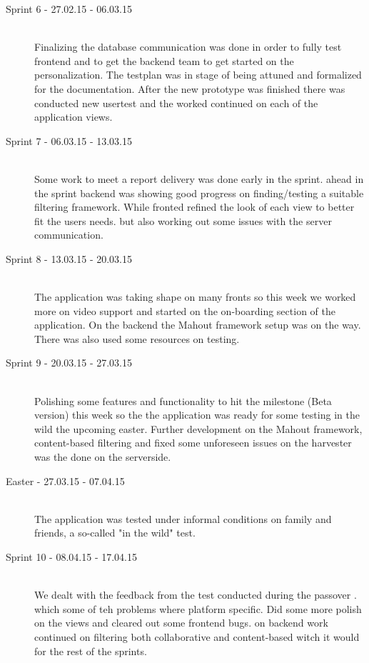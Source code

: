 \begin{description}
	\item[Sprint 6 - 27.02.15 - 06.03.15] \hfill \\ 
	Finalizing the database communication was done in order to fully test frontend and to get the backend team to get started on the personalization. The testplan was in stage of being attuned and formalized for the documentation. After the new prototype was finished there was conducted new usertest and the worked continued on each of the application views.
	
	\item[Sprint 7 - 06.03.15 - 13.03.15] \hfill \\ 
	Some work to meet a report delivery was done early in the sprint. ahead in the sprint backend was showing good progress on finding/testing a suitable filtering framework. While fronted refined the look of each view to better fit the users needs. but also working out some issues with the server communication.
	
	\item[Sprint 8 - 13.03.15 - 20.03.15] \hfill \\ 
	The application was taking shape on many fronts so this week we worked more on video support and started on the on-boarding section of the application. On the backend the Mahout  framework setup was on the way. There was also used some resources on testing.

	\item[Sprint 9 - 20.03.15 - 27.03.15] \hfill \\ 
	Polishing some features and functionality to hit the milestone (Beta version) this week so the the application was ready for some testing in the wild the upcoming easter. Further development on the Mahout framework, content-based filtering and fixed some unforeseen issues on the harvester was the done on the serverside.
	
	\item[Easter - 27.03.15 - 07.04.15] \hfill \\ 
	The application was tested under informal conditions on family and friends, a so-called "in the wild" test.
	
	\item[Sprint 10 - 08.04.15 - 17.04.15] \hfill \\ 
	We dealt with the feedback from the test conducted during the passover  . which some of teh problems where platform specific. Did some more polish on the  views and cleared out some frontend bugs. on backend work continued on filtering both collaborative and content-based witch it would for the rest of the sprints. 


\end{description}
